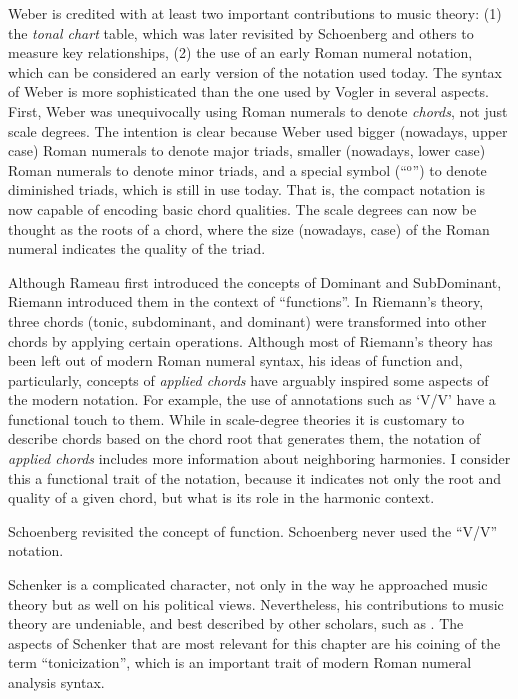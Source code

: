 Weber is credited with at least two important contributions to music theory: (1) the \emph{tonal chart} table, which was later revisited by Schoenberg and others to measure key relationships, (2) the use of an early Roman numeral notation, which can be considered an early version of the notation used today.
The syntax of Weber is more sophisticated than the one used by Vogler in several aspects.
First, Weber was unequivocally using Roman numerals to denote \emph{chords}, not just scale degrees.
The intention is clear because Weber used bigger (nowadays, upper case) Roman numerals to denote major triads, smaller (nowadays, lower case) Roman numerals to denote minor triads, and a special symbol (``$^{\text{o}}$'') to denote diminished triads, which is still in use today.
That is, the compact notation is now capable of encoding basic chord qualities.
The scale degrees can now be thought as the roots of a chord, where the size (nowadays, case) of the Roman numeral indicates the quality of the triad.

Although Rameau first introduced the concepts of Dominant and SubDominant, Riemann introduced them in the context of ``functions''.
In Riemann's theory, three chords (tonic, subdominant, and dominant) were transformed into other chords by applying certain operations.
Although most of Riemann's theory has been left out of modern Roman numeral syntax, his ideas of function and, particularly, concepts of \emph{applied chords} have arguably inspired some aspects of the modern notation.
For example, the use of annotations such as `V/V' have a functional touch to them.
While in scale-degree theories it is customary to describe chords based on the chord root that generates them, the notation of \emph{applied chords} includes more information about neighboring harmonies.
I consider this a functional trait of the notation, because it indicates not only the root and quality of a given chord, but what is its role in the harmonic context.

Schoenberg revisited the concept of function.
Schoenberg never used the ``V/V'' notation.

Schenker is a complicated character, not only in the way he approached music theory but as well on his political views.
Nevertheless, his contributions to music theory are undeniable, and best described by other scholars, such as \textcite{christensen_heinrich_2002}.
The aspects of Schenker that are most relevant for this chapter are his coining of the term ``tonicization'', which is an important trait of modern Roman numeral analysis syntax.

